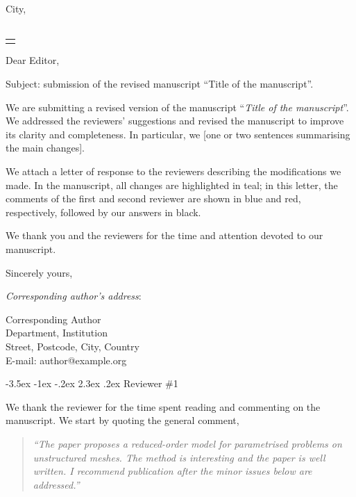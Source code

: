 \documentclass[sigleft]{letter}
\makeatletter
\newcounter{section}
\renewcommand*{\opening}[1]{\ifx\@empty\fromaddress%
  \thispagestyle{firstpage}%
    {\raggedleft\@date\par}%
  \else%
   \thispagestyle{empty}%
   {%
    \begin{minipage}[c]{0.70\linewidth}
    \vspace{-3cm}
    City, \@date\\[2ex]
    \toname \\
    \toaddress
    \end{minipage}
    \begin{minipage}[c]{0.25\linewidth}
    \raggedleft\begin{tabular}{l@{}}\ignorespaces
    \fromaddress\\[0.0em]
    \end{tabular}
    \end{minipage}
    \par
}%
  \fi
  \vspace{2\parskip}%
  #1\par\nobreak}
\newcommand\section{\@startsection{section}{1}{\z@}%
                                  {-3.5ex \@plus -1ex \@minus -.2ex}%
                                  {2.3ex \@plus.2ex}%
                                  {\normalfont\Large\bfseries}}
\newcommand{\reviewerA}[1]{{\color{reviewerAcolor}#1}}
\newcommand{\reviewerB}[1]{{\color{reviewerBcolor}#1}}
\newcommand{\revised}[1]{{\color{revisedcolor}#1}}
\newenvironment{quoteA}{\begin{quote}\itshape\color{reviewerAcolor}}{\end{quote}}
\makeatother
\begin{document}
\begin{letter}{}
\opening{Dear Editor,}

Subject: submission of the revised manuscript ``Title of the manuscript''.

We are submitting a revised version of the manuscript ``\textit{Title of the manuscript}''.
We addressed the reviewers' suggestions and revised the manuscript to improve its clarity and completeness.
In particular, we [one or two sentences summarising the main changes].

We attach a letter of response to the reviewers describing the modifications we made.
In the manuscript, all changes are highlighted in \revised{teal}; in this letter, the comments of the first and second reviewer are shown in \reviewerA{blue} and \reviewerB{red}, respectively, followed by our answers in black.

We thank you and the reviewers for the time and attention devoted to our manuscript.

\closing{Sincerely yours,}

\noindent
\emph{Corresponding author's address}:

\noindent
Corresponding Author\\
Department, Institution\\
Street, Postcode, City, Country\\
E-mail: author@example.org

\end{letter}

\newpage

\reviewerA{\section{Reviewer \#1}}

We thank the reviewer for the time spent reading and commenting on the manuscript. We start by quoting the general comment,

\begin{quoteA}
``The paper proposes a reduced-order model for parametrised problems on unstructured meshes. The method is interesting and the paper is well written. I recommend publication after the minor issues below are addressed.''
\end{quoteA}
\end{document}
